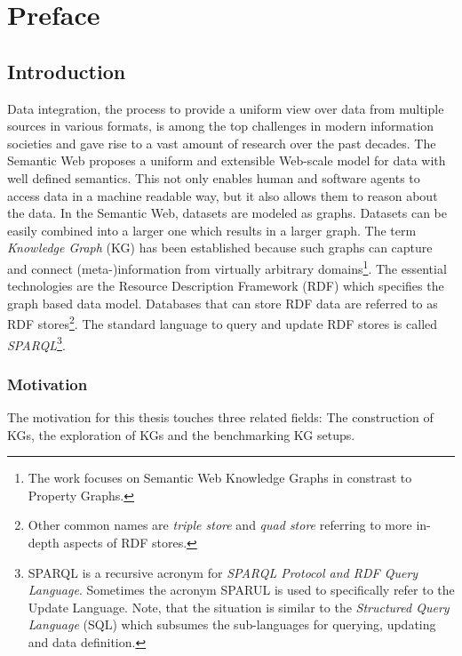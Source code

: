 \chapter*{Preface}

\section{Introduction}

Data integration, the process to provide a uniform view over data from multiple sources in various formats, is among the top challenges in modern information societies and gave rise to a vast amount of research over the past decades. The Semantic Web proposes a uniform and extensible Web-scale model for data with well defined semantics. This not only enables human and software agents to access data in a machine readable way, but it also allows them to reason about the data. In the Semantic Web, datasets are modeled as graphs.
Datasets can be easily combined into a larger one which results in a larger graph.
The term \textit{Knowledge Graph} (KG) has been established because such graphs can capture and connect (meta-)information
from virtually arbitrary domains\footnote{The work focuses on Semantic Web Knowledge Graphs in constrast to Property Graphs.}.
The essential technologies are the Resource Description Framework (RDF) which specifies the graph based data model.
Databases that can store RDF data are referred to as RDF stores\footnote{Other common names are \textit{triple store} and \textit{quad store} referring to more in-depth aspects of RDF stores.}.
The standard language to query and update RDF stores is called \textit{SPARQL}\footnote{SPARQL is a recursive acronym for \textit{SPARQL Protocol and RDF Query Language}. Sometimes the acronym SPARUL is used to specifically refer to the Update Language. Note, that the situation is similar to the \textit{Structured Query Language} (SQL) which subsumes the sub-languages for querying, updating and data definition.}.

\subsection{Motivation}

The motivation for this thesis touches three related fields: The construction of KGs, the exploration of KGs and the benchmarking KG setups.

